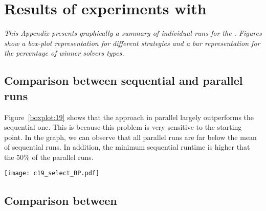 \chapter{Results of experiments with \carrp}
\label{app:cap}
\textit{This Appendix presents graphically a summary of individual runs for the \carrp. Figures show a \textit{box-plot} representation for different strategies and a bar representation for the percentage of winner solvers types.}

\vspace{2ex}\vfill
\minitoc
\newpage

\section{Comparison between sequential and parallel runs}

%

\begin{minipage}[c]{0.50\textwidth}
Figure~\ref{boxplot:19} shows that the approach in parallel largely outperforms the sequential one. This is because this problem is very sensitive to the starting point. In the graph, we can observe that all parallel runs are far below the mean of sequential runs. In addition, the minimum sequential runtime is higher that the 50\% of the parallel runs.
\end{minipage}\hspace{0.05\textwidth}
\begin{minipage}[c]{0.40\textwidth}
\centering
\texttt{[image: c19\_select\_BP.pdf]}
\label{boxplot:19}
\end{minipage}

\section{Comparison between \commstrs}

